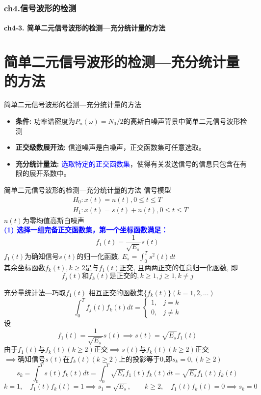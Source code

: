 \begin{frame}[shrink]
  \frametitle{ch4.信号波形的检测}
  \framesubtitle{ch4-3. 简单二元信号波形的检测---充分统计量的方法}
  \tableofcontents[hideallsubsections]
\end{frame}

\section{简单二元信号波形的检测---充分统计量的方法}

\begin{frame}{简单二元信号波形的检测---充分统计量的方法}
\begin{itemize}
	\setlength{\itemsep}{.5cm}
	\item \textbf{条件: }功率谱密度为$P_n(\omega)=N_0/2$的高斯白噪声背景中简单二元信号波形检测
	\item \textbf{正交级数展开法: }信道噪声是白噪声，正交函数集可任意选取。
	\item \textbf{充分统计量法: }\textcolor{blue}{选取特定的正交函数集}，使得有关发送信号的信息只包含在有限的展开系数中。	
\end{itemize}
\end{frame}

\begin{frame}{简单二元信号波形的检测---充分统计量的方法}
信号模型
\begin{align*}
&H_0: x(t)=n(t), 0\le t\le T\\
&H_1: x(t)=s(t)+n(t), 0\le t\le T
\end{align*}
$n(t)$为零均值高斯白噪声\\
\textbf{\textcolor{blue}{(1) 选择一组完备正交函数集，第一个坐标函数满足：}}
\[f_1(t)=\frac{1}{\sqrt{E_s}}s(t)\]
$f_1(t)$为确知信号$s(t)$的归一化函数, $E_s=\int_{0}^{T}s^2(t)dt$\\
其余坐标函数$f_k(t), k\ge 2$是与$f_1(t)$正交, 且两两正交的任意归一化函数, 即
\[f_j(t)\text{和}f_k(t)\text{是正交的}, k\ge 1, j\ge 1, k\ne j \]
\end{frame}

\begin{frame}[shrink]{充分量统计法---巧取$f_1(t)$}
相互正交的函数集$\{f_k(t)\}(k=1,2,\dots)$
\[
\int_{0}^{T}f_j(t)f_k(t)dt=
\begin{cases}
1,&j=k\\
0,&j\ne k
\end{cases}
\]
设
\[ f_1(t)=\frac{1}{\sqrt{E_s}}s(t)\implies s(t)=\sqrt{E_s}f_1(t) \]
由于$f_1(t)$与$f_k(t)(k\ge 2)$正交$\implies s(t)$与$f_k(t)(k\ge 2)$正交\\
$\implies$确知信号$s(t)$在$f_k(t)(k\ge 2)$上的投影等于0,即$s_k=0,(k\ge 2)$\\
\[s_k=\int_{0}^{T}s(t)f_k(t)dt=\int_{0}^{T}\sqrt{E_s}f_1(t)f_k(t)dt=\sqrt{E_s}f_1(t)f_k(t) \]
$k=1,\quad f_1(t)f_k(t)=1\implies s_1=\sqrt{E_s},\qquad k\ge 2,\quad f_1(t)f_k(t)=0\implies s_k=0$\\
\end{frame}

